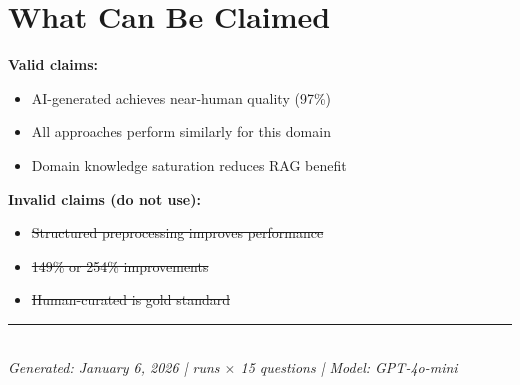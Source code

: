 \documentclass[11pt]{article}
\begin{document}
\section{What Can Be Claimed}

\noindent\textbf{Valid claims:}
\begin{itemize}
    \item AI-generated achieves near-human quality (97\%)
    \item All approaches perform similarly for this domain
    \item Domain knowledge saturation reduces RAG benefit
\end{itemize}

\noindent\textbf{Invalid claims (do not use):}
\begin{itemize}
    \item \sout{Structured preprocessing improves performance}
    \item \sout{149\% or 254\% improvements}
    \item \sout{Human-curated is gold standard}
\end{itemize}

\vfill
\noindent\rule{\textwidth}{0.4pt}\\
\textit{Generated: January 6, 2026 \quad |  runs $\times$ 15 questions \quad | \quad Model: GPT-4o-mini}
\end{document}
